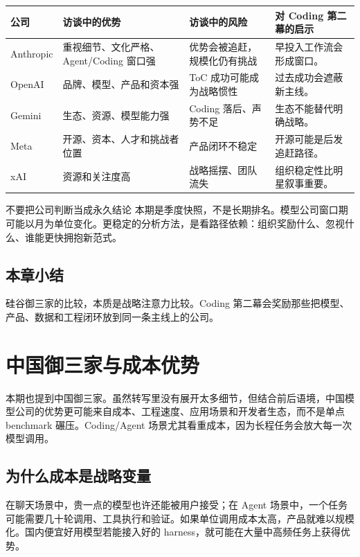 \documentclass[a4paper]{article}
\begin{document}
\noindent\begin{longtable}{p{}p{}p{}p{}}
\toprule
公司 & 访谈中的优势 & 访谈中的风险 & 对 Coding 第二幕的启示 \\
\midrule
Anthropic & 重视细节、文化严格、Agent/Coding 窗口强 & 优势会被追赶，规模化仍有挑战 & 早投入工作流会形成窗口。 \\
OpenAI & 品牌、模型、产品和资本强 & ToC 成功可能成为战略惯性 & 过去成功会遮蔽新主线。 \\
Gemini & 生态、资源、模型能力强 & Coding 落后、声势不足 & 生态不能替代明确战略。 \\
Meta & 开源、资本、人才和挑战者位置 & 产品闭环不稳定 & 开源可能是后发追赶路径。 \\
xAI & 资源和关注度高 & 战略摇摆、团队流失 & 组织稳定性比明星叙事重要。 \\
\bottomrule
\end{longtable}

\begin{warningbox}{不要把公司判断当成永久结论}
本期是季度快照，不是长期排名。模型公司窗口期可能以月为单位变化。更稳定的分析方法，是看路径依赖：组织奖励什么、忽视什么、谁能更快拥抱新范式。
\end{warningbox}

\subsection{本章小结}

硅谷御三家的比较，本质是战略注意力比较。Coding 第二幕会奖励那些把模型、产品、数据和工程闭环放到同一条主线上的公司。

\section{中国御三家与成本优势}

本期也提到中国御三家。虽然转写里没有展开太多细节，但结合前后语境，中国模型公司的优势更可能来自成本、工程速度、应用场景和开发者生态，而不是单点 benchmark 碾压。Coding/Agent 场景尤其看重成本，因为长程任务会放大每一次模型调用。

\subsection{为什么成本是战略变量}

在聊天场景中，贵一点的模型也许还能被用户接受；在 Agent 场景中，一个任务可能需要几十轮调用、工具执行和验证。如果单位调用成本太高，产品就难以规模化。国内便宜好用模型若能接入好的 harness，就可能在大量中高频任务上获得优势。
\end{document}
